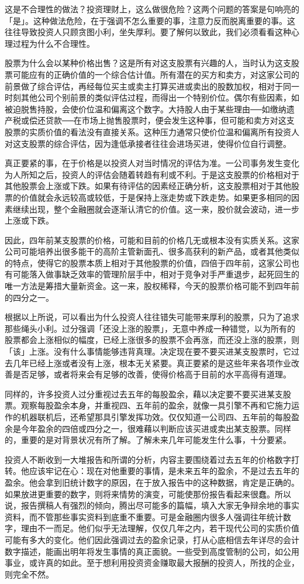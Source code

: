 \documentclass[UTF8,a4paper,zihao=-4,fontset = windows]{ctexart} %
\begin{document}
这是不合理性的做法？投资理财上，这么做很危险？这两个问题的答案是句响亮的「是」。这种做法危险，在于强调不怎么重要的事，注意力反而脱离重要的事。这往往导致投资人只顾贪图小利，坐失厚利。要了解何以致此，我们必须看看这种心理过程为什么不合理性。

股票为什么会以某种价格出售？这是所有对这支股票有兴趣的人，当时认为这支股票可能应有的正确价值的一个综合估计值。所有潜在的买方和卖方，对这家公司的前景做了综合评估，再经每位买主或卖主打算买进或卖出的股数加权，相对于同一时刻其他公司个别前景的类似评估过程，而得出一个特别价位。偶尔有些因素，如被迫脱售持股，会使价位温和偏离这个数字。大持股人由于某些理由──如缴纳遗产税或偿还贷款──在市场上抛售股票时，便会发生这种事，但可能和卖方对这支股票的实质价值的看法没有直接关系。这种压力通常只使价位温和偏离所有投资人对这支股票的综合评估，因为逢低承接者往往会进场买进，使得价位自行调整。

真正要紧的事，在于价格是以投资人对当时情况的评估为准。一公司事务发生变化为人所知之后，投资人的评估会随着转趋有利或不利。于是这支股票的价格相对于其他股票会上涨或下跌。如果有待评估的因素经正确分析，这支股票相对于其他股票的价值就会永远较高或较低，于是保持上涨走势或下跌走势。如果更多相同的因素继续出现，整个金融圈就会逐渐认清它的价值。这一来，股价就会波动，进一步上涨或下跌。

因此，四年前某支股票的价格，可能和目前的价格几无或根本没有实质关系。这家公司可能培养出很多能干的高阶主管新面孔、很多高获利的新产品，或者其他类似的特点，使得它的股票本质上相对于其他股票的价值，四倍于四年前，这家公司也有可能落入做事缺乏效率的管理阶层手中，相对于竞争对手严重退步，起死回生的唯一方法是筹措大量新资金。这一来，股权稀释，今天的股票价格可能不到四年前的四分之一。

根据以上所说，可以看出为什么投资人往往错失可能带来厚利的股票，只为了追求那些绳头小利。过分强调「还没上涨的股票」，无意中养成一种错觉，以为所有的股票都会上涨相似的幅度，已经上涨很多的股票不会再涨，而还没上涨的股票，则「该」上涨。没有什么事情能够违背真理。决定现在要不要买进某支股票时，它过去几年已经上涨或者没有上涨，根本无关紧要。真正要紧的是这些年来各项作业改善是否足够，或者将来会有足够的改善，使得价格高于目前的水平高得有道理。

同样的，许多投资人过分重视过去五年的每股盈余，藉以决定要不要买进某支股票。观察每股盈余本身，并重视四、五年前的盈余，就像一具引擎不再和它施力运作的机器联机后，还希望那具引擎发挥功效。仅仅知道一公司四、五年前的每股盈余是今年盈余的四倍或四分之一，很难藉以判断应该买进或卖出某支股票。同样的，重要的是对背景状况有所了解。了解未来几年可能发生什么事，十分要紧。

投资人不断收到一大堆报告和所谓的分析，内容主要围绕着过去五年的价格数字打转。他应该牢记在心：现在对他重要的事情，是未来五年的盈余，不是过去五年的盈余。他会拿到旧统计数字的原因，在于放入报告中的这种数据，肯定是正确的。如果放进更重要的数字，则将来情势的演变，可能使那份报告看起来很蠢。所以说，报告撰稿人有强烈的倾向，腾出尽可能多的篇幅，填入大家无争辩余地的事实资料，而不管那些事实资料到底重不重要。可是金融圈内很多人强调往年统计数字，理由不一而足。他们似乎无法理解，仅仅几年之内，若干现代公司的实质价值可能有多大的变化。他们因此强调过去的盈余记录，打从心底相信去年详尽的会计数字描述，能画出明年将发生事情的真正面貌。一些受到高度管制的公司，如公用事业，或许真的如此。至于想利用投资资金赚取最大报酬的投资人，所找的企业，则完全不然。
\end{document}
